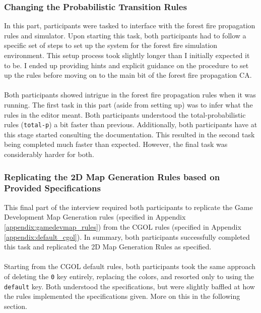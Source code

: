 \subsubsection{Changing the Probabilistic Transition Rules} \label{probabilistic_test}
In this part, participants were tasked to interface with the forest fire propagation rules and simulator. Upon starting this task, both participants had to follow a specific set of steps to set up the system for the forest fire simulation environment. This setup process took slightly longer than I initially expected it to be. I ended up providing hints and explicit guidance on the procedure to set up the rules before moving on to the main bit of the forest fire propagation CA.
\\ \\
Both participants showed intrigue in the forest fire propagation rules when it was running. The first task in this part (aside from setting up) was to infer what the rules in the editor meant. Both participants understood the total-probabilistic rules (\texttt{total-p}) a bit faster than previous. Additionally, both participants have at this stage started consulting the documentation. This resulted in the second task being completed much faster than expected. However, the final task was considerably harder for both. 
\newpage
\subsubsection{Replicating the 2D Map Generation Rules based on Provided Specifications}
This final part of the interview required both participants to replicate the Game Development Map Generation rules (specified in Appendix \ref{appendix:gamedevmap_rules}) from the CGOL rules (specified in Appendix \ref{appendix:default_cgol}). In summary, both participants successfully completed this task and replicated the 2D Map Generation Rules as specified. 
\\ \\
Starting from the CGOL default rules, both participants took the same approach of deleting the \texttt{0} key entirely, replacing the colors, and resorted only to using the \texttt{default} key. Both understood the specifications, but were slightly baffled at how the rules implemented the specifications given. More on this in the following section.

